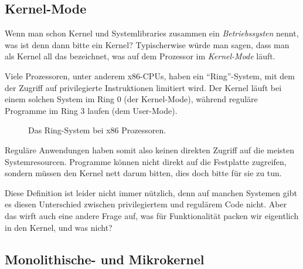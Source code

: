 \documentclass[ngerman,abstract=true]{scrartcl}
\begin{document}
\subsection{Kernel-Mode}

Wenn man schon Kernel und Systemlibraries zusammen ein \emph{Betriebssysten} nennt, was ist denn dann bitte ein Kernel? Typischerwise würde man sagen, dass man als Kernel all das bezeichnet, was auf dem Prozessor im \emph{Kernel-Mode} läuft.

Viele Prozessoren, unter anderem x86-CPUs, haben ein \enquote{Ring}-System, mit dem der Zugriff auf privilegierte Instruktionen limitiert wird. Der Kernel läuft bei einem solchen System im Ring 0 (der Kernel-Mode), während reguläre Programme im Ring 3 laufen (dem User-Mode). 

\begin{figure}[h]\centering
{}
\caption{Das Ring-System bei x86 Prozessoren.}\label{fig:ringsystem}
\end{figure}
Reguläre Anwendungen haben somit also keinen direkten Zugriff auf die meisten Systemresourcen. Programme können nicht direkt auf die Festplatte zugreifen, sondern müssen den Kernel nett darum bitten, dies doch bitte für sie zu tun.

Diese Definition ist leider nicht immer nützlich, denn auf manchen Systemen gibt es diesen Unterschied zwischen privilegiertem und regulärem Code nicht. Aber das wirft auch eine andere Frage auf, was für Funktionalität packen wir eigentlich in den Kernel, und was nicht?

\subsection{Monolithische- und  Mikrokernel}
\end{document}
